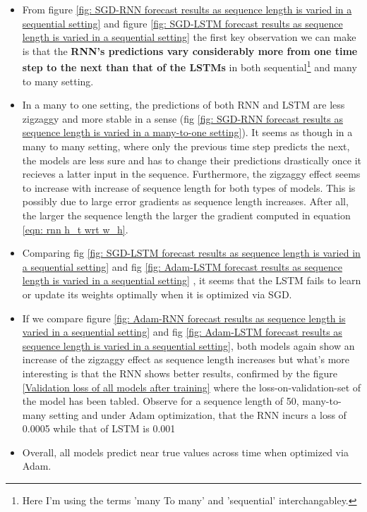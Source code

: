 \documentclass[12pt, letterpaper]{article}
\begin{document}
\begin{itemize}
    \item From figure \ref{fig: SGD-RNN forecast results as sequence length is varied in a sequential setting}
    and figure \ref{fig: SGD-LSTM forecast results as sequence length is varied in a sequential setting}
    the first key observation we can make is that the \textbf{RNN's predictions
    vary considerably more from one time step to the next than that of the 
    LSTMs} in both sequential\footnote{Here I'm using the terms 'many To
    many' and 'sequential' interchangabley.} and many to many setting. 

    \item In a many to one setting, the predictions of both RNN and LSTM are less zigzaggy and more stable in a sense (fig
    \ref{fig: SGD-RNN forecast results as sequence length is varied in a many-to-one setting}).
    It seems as though in a many to many setting, where only the previous
    time step predicts the next, the models are less sure and has to change their 
    predictions drastically once it recieves a latter input in the sequence. Furthermore,
    the zigzaggy effect seems to increase with increase of sequence length for both 
    types of models. This is possibly due to large error gradients as sequence length increases.
    After all, the larger the sequence length the larger the gradient computed in equation \ref{eqn: rnn h_t wrt w_h}.
    
    \item Comparing fig \ref{fig: SGD-LSTM forecast results as sequence length is varied in a sequential setting}
    and fig \ref{fig: Adam-LSTM forecast results as sequence length is varied in a sequential setting}
    , it seems that the LSTM fails to learn or update its weights optimally
    when it is optimized via SGD.

    \item If we compare figure \ref{fig: Adam-RNN forecast results as sequence length is varied in a sequential setting} 
    and fig \ref{fig: Adam-LSTM forecast results as sequence length is varied in a sequential setting}, both models 
    again show an increase of the zigzaggy effect as sequence length increases but what's more interesting is 
    that the RNN shows better results, confirmed by the figure \ref{Validation loss of all models after training} 
    where the loss-on-validation-set of the model has been tabled. Observe for a sequence length of 50, many-to-many setting and under Adam optimization, 
    that the RNN incurs a loss of 0.0005 while that of LSTM is 0.001 
    
    \item Overall, all models predict near true values across time when optimized via Adam.
\end{itemize}
\end{document}
